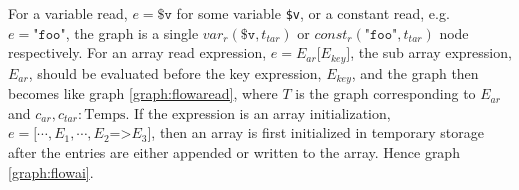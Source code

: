 \begin{graph}
{\begin{adjustbox}{max size={.24\textwidth}{.25\textheight}}
\end{adjustbox}}%
\hspace*{\fill}
\end{graph}

For a variable read, $e = \texttt{\$v}$ for some variable \texttt{\$v}, or a constant read, e.g. $e = \texttt{"foo"}$, the graph is a single $\mathit{var}_r(\texttt{\$v}, t_{tar})$ or $\mathit{const}_r(\texttt{"foo"}, t_{tar})$ node respectively. For an array read expression, $e = E_{ar}\texttt[E_{key}\texttt{]}$, the sub array expression, $E_{ar}$, should be evaluated before the key expression, $E_{key}$, and the graph then becomes like graph \ref{graph:flowaread}, where $T$ is the graph corresponding to $E_{ar}$ and $c_{ar}, c_{tar} : \text{Temps}$. If the expression is an array initialization, $e = \texttt{[}\cdots, E_1, \cdots, E_2\texttt{=>}E_3\texttt{]}$, then an array is first initialized in temporary storage after the entries are either appended or written to the array. Hence graph \ref{graph:flowai}.
